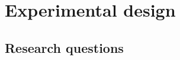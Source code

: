 \documentclass[12pt]{article}
\newcommand{\todo}[1]{\textit{\textcolor{red}{$<$todo$>$ #1 $<$/todo$>$}}}
\begin{document}

















\section{Experimental design}
\label{sec:design}

\subsection{Research questions}
\end{document}
